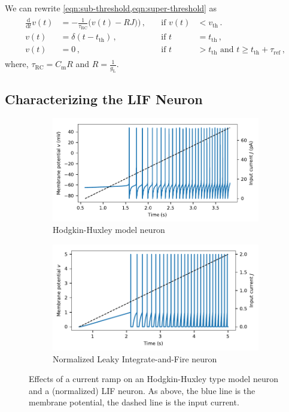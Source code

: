 \documentclass[10pt,letterpaper,oneside]{article}
\begin{document}
We can rewrite \cref{eqn:sub-threshold,eqn:super-threshold} as
\begin{align}
	\begin{aligned}
		\frac{\mathrm{d}}{\mathrm{d}t} v(t) &= -\frac{1}{\tau_\mathrm{RC}} \big( v(t) - RJ \big)
		\big) \,, \quad &\text{if } v(t) &< v_\mathrm{th}\,. \\
		v(t) &= \delta(t - t_\mathrm{th}) \,, &\text{if } t &= t_\mathrm{th} \,,\\
v(t) &= 0 \,, &\text{if } t &> t_\mathrm{th} \text{ and } t \geq t_\mathrm{th} + \tau_\mathrm{ref} \,,
	\end{aligned}
	\label{eqn:sub-threshold-normalised}
\end{align}
where, $\tau_\mathrm{RC} = C_\mathrm{m} R$ and $R = \frac{1}{g_\mathrm{L}}$.

\subsection{Characterizing the LIF Neuron}

\begin{figure}[t]
	\begin{subfigure}{\textwidth}
		\centering
		\includegraphics{media/hh_neuron_ramp.pdf}
		\caption{Hodgkin-Huxley model neuron}
	\end{subfigure}
	\begin{subfigure}{\textwidth}
		\centering
		\includegraphics{media/lif_neuron_ramp.pdf}
		\caption{Normalized Leaky Integrate-and-Fire neuron}
	\end{subfigure}
	\caption{Effects of a current ramp on an Hodgkin-Huxley type model neuron and a (normalized) LIF neuron. As above, the blue line is the membrane potential, the dashed line is the input current.}
\end{figure}
\end{document}
